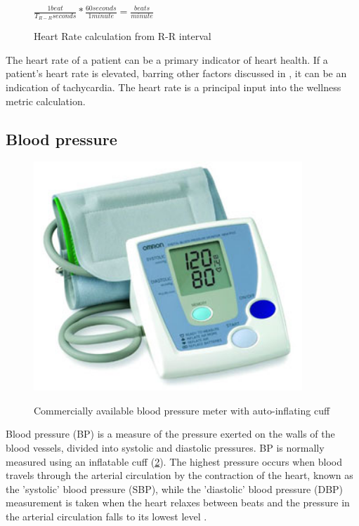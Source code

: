 \begin{figure}
	\begin{center}
		\label{fig:RR_PulseRateCalc}
		$\frac{1 beat}{T_{R-R} seconds}*\frac{60 seconds}{1 minute}=\frac{beats}{minute}$
		\caption{Heart Rate calculation from R-R interval}
	\end{center}
\end{figure}

The heart rate of a patient can be a primary indicator of heart health. If a patient's heart rate is elevated, barring other factors discussed in , it can be an indication of tachycardia. The heart rate is a principal input into the wellness metric calculation.

\subsection{Blood pressure}
\label{subsec:BloodPressure}
\begin{figure}
	\begin{center}
		\label{fig:BP_cuff}
		\includegraphics[scale=1,width=0.9\textwidth]{Images/BPCuff.png} 
		\caption{Commercially available blood pressure meter with auto-inflating cuff}
	\end{center}
\end{figure}

Blood pressure (BP) is a measure of the pressure exerted on the walls of the blood vessels, divided into systolic and diastolic pressures. BP is normally measured using an inflatable cuff (\cref{fig:BP_cuff}). The highest pressure occurs when blood travels through the arterial circulation by the contraction of the heart,  known as the 'systolic' blood pressure (SBP), while the 'diastolic' blood pressure (DBP) measurement is taken when the heart relaxes between beats and the pressure in the arterial circulation falls to its lowest level \cite{NOORDIN2009}. 

